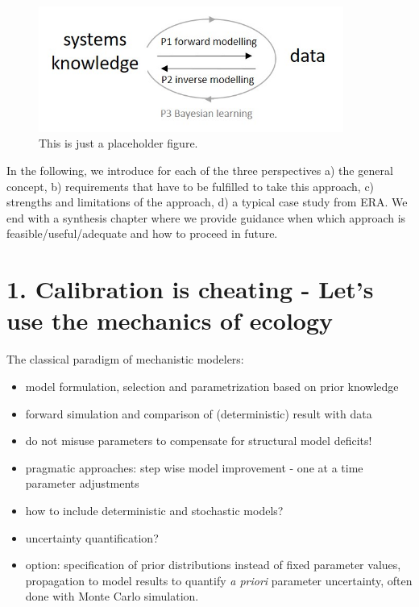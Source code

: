\documentclass [english,11pt]{article} %
\begin{document}
\begin{figure}[H]
\centering
\includegraphics[width=10cm]{Fig1.jpg} 
\caption{This is just a placeholder figure.}
	\label{fig1}
\end{figure}

In the following, we introduce for each of the three perspectives
a) the general concept, 
b) requirements that have to be fulfilled to take this approach,
c) strengths and limitations of the approach, 
d) a typical case study from ERA.
We end with a synthesis chapter where we provide guidance when which approach is feasible/useful/adequate and how to proceed in future.

\newpage

\section*{1. Calibration is cheating - Let’s use the mechanics of ecology}  %
\label{sec:1}

%

\noindent
The classical paradigm of mechanistic modelers: 
\begin{itemize}
\item model formulation, selection and parametrization based on prior knowledge
\item forward simulation and comparison of (deterministic) result with data
\item do not misuse parameters to compensate for structural model deficits!
\item pragmatic approaches: step wise model improvement - one at a time parameter adjustments
\item how to include deterministic and stochastic models?
\item uncertainty quantification?
\item option: specification of \gls{prior distribution}s instead of fixed parameter values, propagation to model results to quantify \emph{a priori} parameter uncertainty, often done with \Gls{Monte Carlo simulation}. 
\end{itemize}
\end{document}
